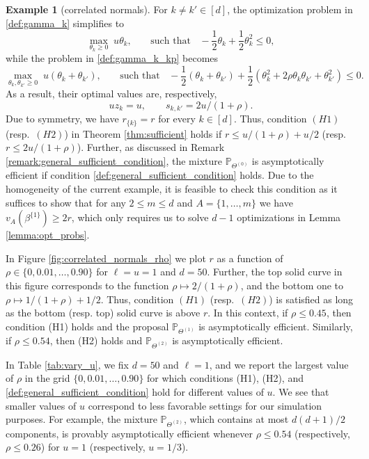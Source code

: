 \documentclass[aap,preprint]{imsart}
\newcommand{\Pro}{{\mathbb{P}}}
\newcommand{\Exp}{{\mathbb{E}}}
\newcommand{\Var}{{\textup{Var}}}
\theoremstyle{plain}
\theoremstyle{definition}
\newtheorem{example}{Example}
\begin{document}
\begin{example}[correlated normals]
For $k \neq k' \in [d]$, the optimization problem in \eqref{def:gamma_k} simplifies to
$$
\max_{\theta_{k} \geq 0}\; u \theta_k, \quad\;\;\text{ such that } \;\;  -\frac{1}{2}\theta_k + \frac{1}{2} \theta_k^2 \leq 0,
$$
while the problem in \eqref{def:gamma_k_kp} becomes
$$
\max_{\theta_{k}, \theta_{k'} \geq 0}\; u (\theta_k + \theta_{k'}), \quad\;\;\text{ such that } \;\;  -\frac{1}{2}(\theta_k + \theta_{k'}) + \frac{1}{2} (\theta_k^2 + 2\rho \theta_k \theta_{k'} + \theta_{k'}^2) \leq 0.
$$
As a result, their optimal values are, respectively,
$$
u z_k = u, \qquad s_{k,k'} = 2u/(1+\rho).
$$
Due to symmetry, we have $r_{\{k\}}=r$ for every $k \in [d]$.  Thus, condition   $(H1)$ (resp.~$(H2)$) in Theorem \ref{thm:sufficient} holds  if
$r \leq u/(1+\rho) + u/2$ (resp. $r \leq 2u/(1+\rho)$).  Further, as discussed in Remark \ref{remark:general_sufficient_condition}, the mixture
$\Pro_{\Theta^{(0)}}$ is asymptotically efficient if condition \eqref{def:general_sufficient_condition} holds.  Due to the homogeneity of the current example, it is feasible to check this condition as it suffices to show that for any $2 \leq m \leq d$ and $A =\{1,\ldots,m\}$ we have
$v_A(\beta^{\{1\}}) \geq 2 r$, 
which only requires us to solve $d-1$ optimizations in Lemma \ref{lemma:opt_probs}. 





In Figure \ref{fig:correlated_normals_rho} we plot $r$ as a function of $\rho \in \{0,0.01,\ldots,0.90\}$ for 
$\ell = u =1$ and $d=50$.
Further, the top solid curve  in this figure corresponds to the function $\rho \mapsto 2/(1+\rho)$, and the bottom one to $\rho \mapsto 1/(1+\rho) + 1/2$. Thus, condition   $(H1)$ (resp.~$(H2)$) is satisfied as long as the bottom (resp. top) solid curve is above $r$. In this context,  if $\rho \leq 0.45$, then condition (H1) holds and the proposal $\Pro_{\Theta^{(1)}}$ is asymptotically efficient. Similarly, if $\rho \leq 0.54$, then (H2) holds and $\Pro_{\Theta^{(2)}}$ is asymptotically efficient.

In Table \ref{tab:vary_u}, we fix $d = 50$ and $\ell = 1$, and we report the largest value of $\rho$ in the grid $\{0, 0.01, \ldots, 0.90\}$ for which conditions (H1),  (H2), and \eqref{def:general_sufficient_condition} hold  for different values of  $u$. We see that  smaller values of $u$ correspond to less favorable settings for our simulation purposes. For example, the mixture $\Pro_{\Theta^{(2)}}$, which contains at most $d(d+1)/2$ components, is provably asymptotically efficient whenever $\rho \leq 0.54$ (respectively, $\rho \leq 0.26$) 
for $u = 1$ (respectively, $u = 1/3$).




\end{example}
\end{document}
